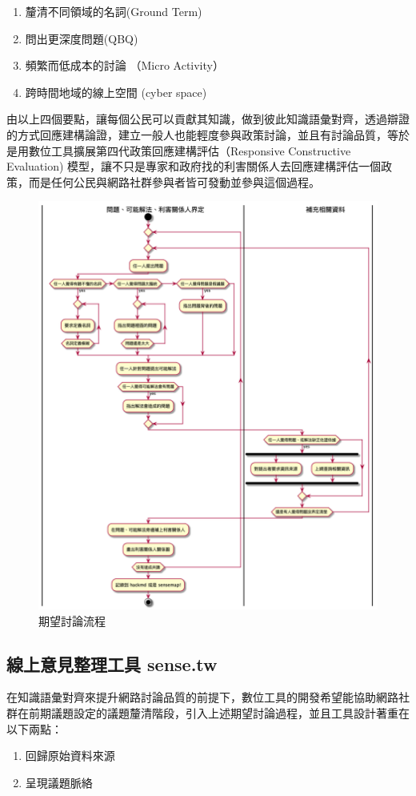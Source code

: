 \documentclass[12pt,a4paper]{article}
\begin{document}
\begin{enumerate}
\item 釐清不同領域的名詞(Ground Term)
\item 問出更深度問題(QBQ)
\item 頻繁而低成本的討論 （Micro Activity）
\item 跨時間地域的線上空間 (cyber space)
\end{enumerate}

由以上四個要點，讓每個公民可以貢獻其知識，做到彼此知識語彙對齊，透過辯證的方式回應建構論證，建立一般人也能輕度參與政策討論，並且有討論品質，等於是用數位工具擴展第四代政策回應建構評估（Responsive Constructive Evaluation) \citep{guba01} 模型，讓不只是專家和政府找的利害關係人去回應建構評估一個政策，而是任何公民與網路社群參與者皆可發動並參與這個過程。

\begin{figure}[htbp]
\centering
\includegraphics[width=.9\linewidth]{./images/problem_idenity_flow.png}
\caption{\label{fig:org9e367c3}
期望討論流程}
\end{figure}
\subsection{線上意見整理工具 sense.tw }
\label{sec:orgff11195}
在知識語彙對齊來提升網路討論品質的前提下，數位工具的開發希望能協助網路社群在前期議題設定的議題釐清階段，引入上述期望討論過程，並且工具設計著重在以下兩點：
\begin{enumerate}
\item 回歸原始資料來源
\item 呈現議題脈絡
\end{enumerate}
\end{document}

